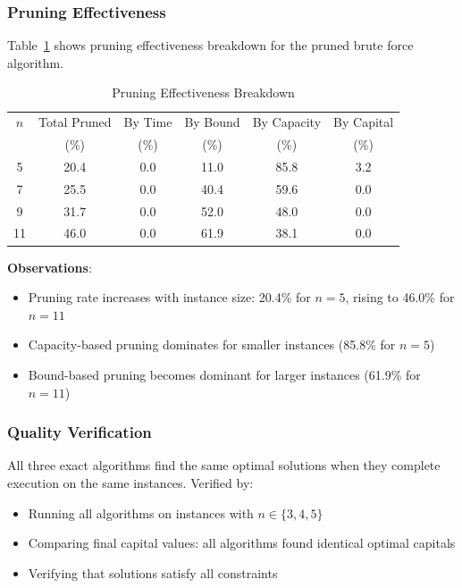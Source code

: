 \documentclass[12pt]{article}
\begin{document}
\subsubsection{Pruning Effectiveness}

Table~\ref{tab:pruning} shows pruning effectiveness breakdown for the pruned brute force algorithm.

\begin{table}[h]
\centering
\caption{Pruning Effectiveness Breakdown}
\label{tab:pruning}
\begin{tabular}{c|ccccc}
\toprule
$n$ & Total Pruned & By Time & By Bound & By Capacity & By Capital \\
 & (\%) & (\%) & (\%) & (\%) & (\%) \\
\midrule
5 & 20.4 & 0.0 & 11.0 & 85.8 & 3.2 \\
7 & 25.5 & 0.0 & 40.4 & 59.6 & 0.0 \\
9 & 31.7 & 0.0 & 52.0 & 48.0 & 0.0 \\
11 & 46.0 & 0.0 & 61.9 & 38.1 & 0.0 \\
\bottomrule
\end{tabular}
\end{table}

\textbf{Observations}:
\begin{itemize}
    \item Pruning rate increases with instance size: 20.4\% for $n=5$, rising to 46.0\% for $n=11$
    \item Capacity-based pruning dominates for smaller instances (85.8\% for $n=5$)
    \item Bound-based pruning becomes dominant for larger instances (61.9\% for $n=11$)
\end{itemize}

\subsubsection{Quality Verification}

All three exact algorithms find the same optimal solutions when they complete execution on the same instances. Verified by:
\begin{itemize}
    \item Running all algorithms on instances with $n \in \{3, 4, 5\}$
    \item Comparing final capital values: all algorithms found identical optimal capitals
    \item Verifying that solutions satisfy all constraints
\end{itemize}
\end{document}
